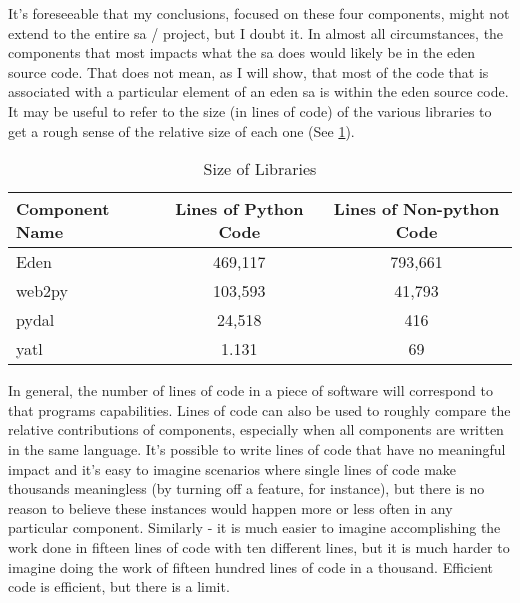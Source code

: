 \documentclass[a4paper,man,natbib,floatsintext]{apa6}
\begin{document}
  It's foreseeable that my conclusions, focused on these four components, might not extend to the entire \gls{sa} / project, but I doubt it. In almost all circumstances, the components that most impacts what the \gls{sa} does would likely be in the \acrshort{eden} source code. That does not mean, as I will show, that most of the code that is associated with a particular element of an \acrshort{eden} \gls{sa} is within the \acrshort{eden} source code. It may be useful to refer to the size (in lines of code) of the various libraries to get a rough sense of the relative size of each one (See \ref{tab:table-2}). 

  \begin{table}[ht]
  \caption{Size of Libraries}
  \label{tab:table-2}
  \begin{tabular}{|l|c|c|}
  \hline
  Component Name & Lines of Python Code & Lines of Non-python Code \\ \hline
  Eden           & 469,117              & 793,661                  \\ \hline
  web2py         & 103,593              & 41,793                   \\ \hline
  pydal          & 24,518               & 416                      \\ \hline
  yatl           & 1.131                & 69                       \\ \hline
  \end{tabular}
\end{table}

  In general, the number of lines of code in a piece of software will correspond to that programs capabilities. Lines of code can also be used to roughly compare the relative contributions of components, especially when all components are written in the same language. It's possible to write lines of code that have no meaningful impact and it's easy to imagine scenarios where single lines of code make thousands meaningless (by turning off a feature, for instance), but there is no reason to believe these instances would happen more or less often in any particular component. Similarly -  it is much easier to imagine accomplishing the work done in fifteen lines of code with ten different lines, but it is much harder to imagine doing the work of fifteen hundred lines of code in a thousand. Efficient code is efficient, but there is a limit.

\end{document}
